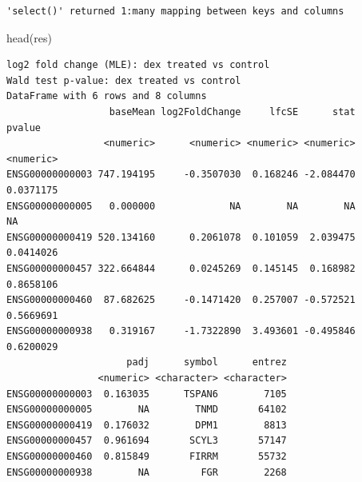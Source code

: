\documentclass[
  letterpaper,
  DIV=11,
  numbers=noendperiod]{scrartcl}
\newenvironment{Shaded}{\begin{snugshade}}{\end{snugshade}}
\newcommand{\AttributeTok}[1]{\textcolor[rgb]{0.40,0.45,0.13}{#1}}
\newcommand{\CommentTok}[1]{\textcolor[rgb]{0.37,0.37,0.37}{#1}}
\newcommand{\FunctionTok}[1]{\textcolor[rgb]{0.28,0.35,0.67}{#1}}
\newcommand{\NormalTok}[1]{\textcolor[rgb]{0.00,0.23,0.31}{#1}}
\newcommand{\OtherTok}[1]{\textcolor[rgb]{0.00,0.23,0.31}{#1}}
\newcommand{\SpecialCharTok}[1]{\textcolor[rgb]{0.37,0.37,0.37}{#1}}
\newcommand{\StringTok}[1]{\textcolor[rgb]{0.13,0.47,0.30}{#1}}
\begin{document}
\begin{verbatim}
'select()' returned 1:many mapping between keys and columns
\end{verbatim}

\begin{Shaded}
\begin{Highlighting}[]
\FunctionTok{head}\NormalTok{(res)}
\end{Highlighting}
\end{Shaded}

\begin{verbatim}
log2 fold change (MLE): dex treated vs control 
Wald test p-value: dex treated vs control 
DataFrame with 6 rows and 8 columns
                  baseMean log2FoldChange     lfcSE      stat    pvalue
                 <numeric>      <numeric> <numeric> <numeric> <numeric>
ENSG00000000003 747.194195     -0.3507030  0.168246 -2.084470 0.0371175
ENSG00000000005   0.000000             NA        NA        NA        NA
ENSG00000000419 520.134160      0.2061078  0.101059  2.039475 0.0414026
ENSG00000000457 322.664844      0.0245269  0.145145  0.168982 0.8658106
ENSG00000000460  87.682625     -0.1471420  0.257007 -0.572521 0.5669691
ENSG00000000938   0.319167     -1.7322890  3.493601 -0.495846 0.6200029
                     padj      symbol      entrez
                <numeric> <character> <character>
ENSG00000000003  0.163035      TSPAN6        7105
ENSG00000000005        NA        TNMD       64102
ENSG00000000419  0.176032        DPM1        8813
ENSG00000000457  0.961694       SCYL3       57147
ENSG00000000460  0.815849       FIRRM       55732
ENSG00000000938        NA         FGR        2268
\end{verbatim}

\begin{Shaded}
\end{Shaded}
\end{document}
